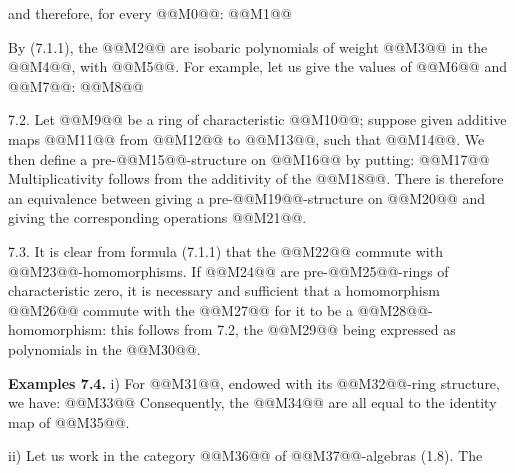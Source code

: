 and therefore, for every @@M0@@:
@@M1@@

By (7.1.1), the @@M2@@ are isobaric polynomials of weight @@M3@@ in the @@M4@@, with @@M5@@. For example, let us give the values of @@M6@@ and @@M7@@:
@@M8@@

7.2. Let @@M9@@ be a ring of characteristic @@M10@@; suppose given additive maps @@M11@@ from @@M12@@ to @@M13@@, such that @@M14@@. We then define a pre-@@M15@@-structure on @@M16@@ by putting:
@@M17@@
Multiplicativity follows from the additivity of the @@M18@@. There is therefore an equivalence between giving a pre-@@M19@@-structure on @@M20@@ and giving the corresponding operations @@M21@@.

7.3. It is clear from formula (7.1.1) that the @@M22@@ commute with @@M23@@-homomorphisms. If @@M24@@ are pre-@@M25@@-rings of characteristic zero, it is necessary and sufficient that a homomorphism @@M26@@ commute with the @@M27@@ for it to be a @@M28@@-homomorphism: this follows from 7.2, the @@M29@@ being expressed as polynomials in the @@M30@@.

\textbf{Examples 7.4.} i) For @@M31@@, endowed with its @@M32@@-ring structure, we have:
@@M33@@
Consequently, the @@M34@@ are all equal to the identity map of @@M35@@.

ii) Let us work in the category @@M36@@ of @@M37@@-algebras (1.8). The
